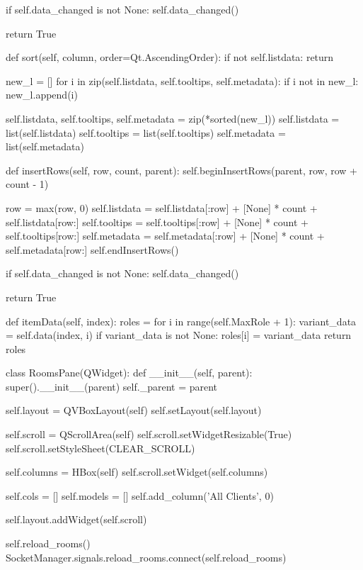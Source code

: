 \begin{pythoncode}
        if self.data_changed is not None:
            self.data_changed()

        return True

    def sort(self, column, order=Qt.AscendingOrder):
        if not self.listdata:
            return

        new_l = []
        for i in zip(self.listdata, self.tooltips, self.metadata):
            if i not in new_l:
                new_l.append(i)

        self.listdata, self.tooltips, self.metadata = zip(*sorted(new_l))
        self.listdata = list(self.listdata)
        self.tooltips = list(self.tooltips)
        self.metadata = list(self.metadata)

    def insertRows(self, row, count, parent):
        self.beginInsertRows(parent, row, row + count - 1)

        row = max(row, 0)
        self.listdata = self.listdata[:row] + [None] * count + self.listdata[row:]
        self.tooltips = self.tooltips[:row] + [None] * count + self.tooltips[row:]
        self.metadata = self.metadata[:row] + [None] * count + self.metadata[row:]
        self.endInsertRows()

        if self.data_changed is not None:
            self.data_changed()

        return True

    def itemData(self, index):
        roles = {}
        for i in range(self.MaxRole + 1):
            variant_data = self.data(index, i)
            if variant_data is not None:
                roles[i] = variant_data
        return roles


class RoomsPane(QWidget):
    def __init__(self, parent):
        super().__init__(parent)
        self._parent = parent

        self.layout = QVBoxLayout(self)
        self.setLayout(self.layout)

        self.scroll = QScrollArea(self)
        self.scroll.setWidgetResizable(True)
        self.scroll.setStyleSheet(CLEAR_SCROLL)

        self.columns = HBox(self)
        self.scroll.setWidget(self.columns)

        self.cols = []
        self.models = []
        self.add_column('All Clients', 0)

        self.layout.addWidget(self.scroll)

        self.reload_rooms()
        SocketManager.signals.reload_rooms.connect(self.reload_rooms)


\end{pythoncode}
